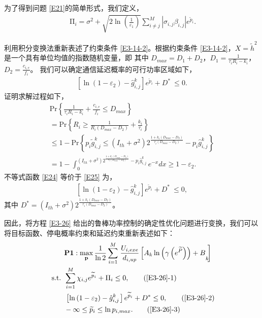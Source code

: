 为了得到问题 \eqref{E21}的简单形式，我们定义，
\begin{eqnarray}\label{E22}
\ \mathrm{\Pi}_i=\sigma^2+\sqrt{2\ln\left(\frac{1}{\varepsilon_1}\right)}\sum_{i\neq j}^{M}{\left|\sigma_{i,j}\beta_{i,j}\right|e^{{\widetilde{p}}_i}}.
\end{eqnarray}

利用积分变换法重新表述了约束条件 \eqref{E3-14-2}。根据约束条件 \eqref{E3-14-2}，$X={\widetilde{h}}^2$ 是一个具有单位均值的指数随机变量，即 其中 $D_{max}=D_1+D_2 $，$D_1=\frac{1}{\tau_iR_i-k_i} $，$D_2=\frac{c_{i,e}}{f_i} $。 我们可以确定通信延迟概率的可行功率区域如下，
\begin{eqnarray}\label{E23}
\left.\left[\ln\left(1-\varepsilon_2\right)-{\hat{g}}_{i,j}^k\right.\right]e^{{\widetilde{p}}_i}+D^\ast\ \le0.
\end{eqnarray}
证明求解过程如下，
\begin{equation}\label{E24}
\begin{array}{ll}
\textrm{Pr}\left\{\frac{1}{\tau_iR_i-k_i}+\frac{c_{i,e}}{f_i}\le D_{max}\right\}\\
=\textrm{Pr}\left\{R_i\geq\frac{1}{R_i\left(D_{max}-D_2\right)}+\frac{k_i}{\tau_i}\right\}\\
\!\le1\!-\!\textrm{Pr}\left\{p_i{\widetilde{g}}_{i,j}^k\le\left(I_{th}+\sigma^2\right)2^\frac{1+k_i\left(D_{max}-D_2\right)}{\tau_i\left(D_{max}-D_2\right)}-p_i{\hat{g}}_{i,j}^k\right\}\\
=\!1\!-\!\int_{0}^{\left(I_{th}+\sigma^2\right)2^\frac{1+k_i\left(D_{max}-D_2\right)}{\tau_i\left(D_{max}-D_2\right)}-p_i{\hat{g}}_{i,j}^k}{e^{-x}dx}\!\geq\!1-\varepsilon_2.
\end{array}
\end{equation}
不等式函数 \eqref{E24} 等价于 \eqref{E25} 为，
\begin{eqnarray}\label{E25}
\left.\left[\ln\left(1-\varepsilon_2\right)-{\hat{g}}_{i,j}^k\right.\right]e^{{\widetilde{p}}_i}+D^\ast\ \le0,
\end{eqnarray}
其中 $D^\ast=\left(I_{th}+\sigma^2\right)2^\frac{1+k_i\left(D_{max}-D_2\right)}{\tau_i\left(D_{max}-D_2\right)}$。

因此，将方程 \eqref{E3-26} 给出的鲁棒功率控制的确定性优化问题进行变换，我们可以将目标函数、停电概率约束和延迟约束重新表述如下：
\begin{align}
&\textbf{P1}:\max\limits_{\mathbf{p}}\frac{1}{\ln{2}}\sum_{i=1}^{M}\left.\frac{U_{i,exe}}{d_{i,up}}
\left[{A_k\ln{\left(\gamma\left(e^{\widetilde{P}}\right)\right)}+B}_k\!\!\right.\right]                         \label{E3-26}\\
\text { s.t. }
& \sum_{i=1}^{M}{\chi_{i,j}e^{{\widetilde{p}}_i}}+\mathrm{\Pi}_i\le0,                                           \tag{\ref{E3-26}{-1}}      \label{E3-26-1}\\  %
& \left.\left[\ln\left(1-\varepsilon_2\right)-{\hat{g}}_{i,j}^k\right.\right]e^{{\widetilde{p}}_i}+D^\ast\le0,  \tag{\ref{E3-26}{-2}}      \label{E3-26-2}\\  %
& -\infty\le{\widetilde{p}}_i\le \ln{p_{i,max}}.                                                                \tag{\ref{E3-26}{-3}}      \label{E3-26-3}  %
\end{align}
